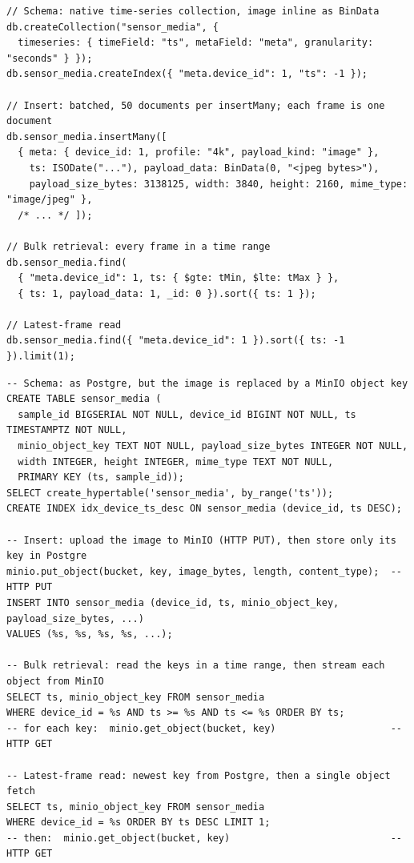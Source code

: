 \documentclass[11pt]{article}
\begin{document}
\begin{lstlisting}[language=MongoJS,caption={MongoDB (Mongo): native time-series collection schema and the same operations (image stored inline as \texttt{BinData}).},label={lst:mongo}]
// Schema: native time-series collection, image inline as BinData
db.createCollection("sensor_media", {
  timeseries: { timeField: "ts", metaField: "meta", granularity: "seconds" } });
db.sensor_media.createIndex({ "meta.device_id": 1, "ts": -1 });

// Insert: batched, 50 documents per insertMany; each frame is one document
db.sensor_media.insertMany([
  { meta: { device_id: 1, profile: "4k", payload_kind: "image" },
    ts: ISODate("..."), payload_data: BinData(0, "<jpeg bytes>"),
    payload_size_bytes: 3138125, width: 3840, height: 2160, mime_type: "image/jpeg" },
  /* ... */ ]);

// Bulk retrieval: every frame in a time range
db.sensor_media.find(
  { "meta.device_id": 1, ts: { $gte: tMin, $lte: tMax } },
  { ts: 1, payload_data: 1, _id: 0 }).sort({ ts: 1 });

// Latest-frame read
db.sensor_media.find({ "meta.device_id": 1 }).sort({ ts: -1 }).limit(1);
\end{lstlisting}

\begin{lstlisting}[language=PgSQL,caption={PostgreSQL+MinIO (PostMin): the relational schema stores a MinIO object key in place of the image, so each operation pairs a PostgreSQL query with a MinIO HTTP transfer (\texttt{put\_object}/\texttt{get\_object}).},label={lst:pm}]
-- Schema: as Postgre, but the image is replaced by a MinIO object key
CREATE TABLE sensor_media (
  sample_id BIGSERIAL NOT NULL, device_id BIGINT NOT NULL, ts TIMESTAMPTZ NOT NULL,
  minio_object_key TEXT NOT NULL, payload_size_bytes INTEGER NOT NULL,
  width INTEGER, height INTEGER, mime_type TEXT NOT NULL,
  PRIMARY KEY (ts, sample_id));
SELECT create_hypertable('sensor_media', by_range('ts'));
CREATE INDEX idx_device_ts_desc ON sensor_media (device_id, ts DESC);

-- Insert: upload the image to MinIO (HTTP PUT), then store only its key in Postgre
minio.put_object(bucket, key, image_bytes, length, content_type);  -- HTTP PUT
INSERT INTO sensor_media (device_id, ts, minio_object_key, payload_size_bytes, ...)
VALUES (%s, %s, %s, %s, ...);

-- Bulk retrieval: read the keys in a time range, then stream each object from MinIO
SELECT ts, minio_object_key FROM sensor_media
WHERE device_id = %s AND ts >= %s AND ts <= %s ORDER BY ts;
-- for each key:  minio.get_object(bucket, key)                    -- HTTP GET

-- Latest-frame read: newest key from Postgre, then a single object fetch
SELECT ts, minio_object_key FROM sensor_media
WHERE device_id = %s ORDER BY ts DESC LIMIT 1;
-- then:  minio.get_object(bucket, key)                            -- HTTP GET
\end{lstlisting}
\end{document}

